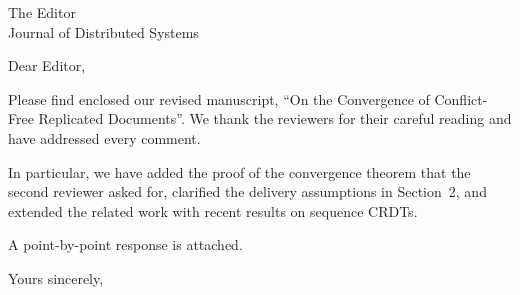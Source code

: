 \documentclass[11pt]{letter}
\begin{document}
\begin{letter}{The Editor\\Journal of Distributed Systems}
\opening{Dear Editor,}

Please find enclosed our revised manuscript, ``On the Convergence of
Conflict-Free Replicated Documents''. We thank the reviewers for their careful
reading and have addressed every comment.

In particular, we have added the proof of the convergence theorem that the
second reviewer asked for, clarified the delivery assumptions in Section~2,
and extended the related work with recent results on sequence CRDTs.

A point-by-point response is attached.

\closing{Yours sincerely,}
\end{letter}
\end{document}
